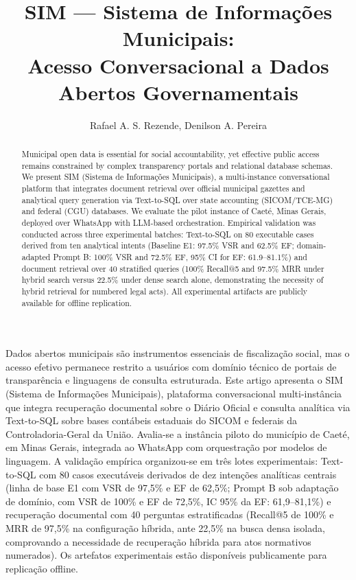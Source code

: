 \documentclass[12pt]{article}
\title{SIM --- Sistema de Informações Municipais:\\
Acesso Conversacional a Dados Abertos Governamentais}
\author{Rafael A. S. Rezende\inst{1}, Denilson A. Pereira\inst{1}}
\begin{document}
\maketitle

\begin{otherlanguage}{english}
\begin{abstract}
Municipal open data is essential for social accountability, yet effective public access remains constrained by complex transparency portals and relational database schemas. We present SIM (Sistema de Informações Municipais), a multi-instance conversational platform that integrates document retrieval over official municipal gazettes and analytical query generation via Text-to-SQL over state accounting (SICOM/TCE-MG) and federal (CGU) databases. We evaluate the pilot instance of Caeté, Minas Gerais, deployed over WhatsApp with LLM-based orchestration. Empirical validation was conducted across three experimental batches: Text-to-SQL on 80 executable cases derived from ten analytical intents (Baseline E1: 97.5\% VSR and 62.5\% EF; domain-adapted Prompt B: 100\% VSR and 72.5\% EF, 95\% CI for EF: 61.9--81.1\%) and document retrieval over 40 stratified queries (100\% Recall@5 and 97.5\% MRR under hybrid search versus 22.5\% under dense search alone, demonstrating the necessity of hybrid retrieval for numbered legal acts). All experimental artifacts are publicly available for offline replication.
\end{abstract}
\end{otherlanguage}

\begin{resumo}
Dados abertos municipais são instrumentos essenciais de fiscalização social, mas o acesso efetivo permanece restrito a usuários com domínio técnico de portais de transparência e linguagens de consulta estruturada. Este artigo apresenta o SIM (Sistema de Informações Municipais), plataforma conversacional multi-instância que integra recuperação documental sobre o Diário Oficial e consulta analítica via Text-to-SQL sobre bases contábeis estaduais do SICOM e federais da Controladoria-Geral da União. Avalia-se a instância piloto do município de Caeté, em Minas Gerais, integrada ao WhatsApp com orquestração por modelos de linguagem. A validação empírica organizou-se em três lotes experimentais: Text-to-SQL com 80 casos executáveis derivados de dez intenções analíticas centrais (linha de base E1 com VSR de 97,5\% e EF de 62,5\%; Prompt B sob adaptação de domínio, com VSR de 100\% e EF de 72,5\%, IC 95\% da EF: 61,9--81,1\%) e recuperação documental com 40 perguntas estratificadas (Recall@5 de 100\% e MRR de 97,5\% na configuração híbrida, ante 22,5\% na busca densa isolada, comprovando a necessidade de recuperação híbrida para atos normativos numerados). Os artefatos experimentais estão disponíveis publicamente para replicação offline.
\end{resumo}
\end{document}
